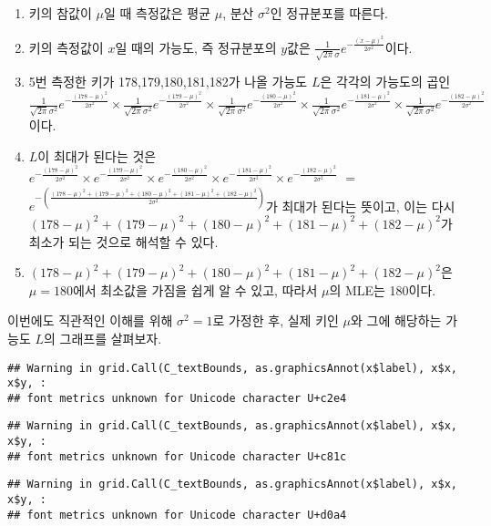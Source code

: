 \documentclass[]{book}
\providecommand{\tightlist}{%
  \setlength{\itemsep}{0pt}\setlength{\parskip}{0pt}}
\begin{document}
\begin{enumerate}
\def\labelenumi{\arabic{enumi}.}
\tightlist
\item
  키의 참값이 \(\mu\)일 때 측정값은 평균 \(\mu\), 분산 \(\sigma^2\)인 정규분포를 따른다.
\item
  키의 측정값이 \(x\)일 때의 가능도, 즉 정규분포의 \(y\)값은 \(\frac{1}{\sqrt{2\pi}\sigma}e^{-\frac{(x-\mu)^2}{2\sigma^2}}\)이다.
\item
  5번 측정한 키가 178,179,180,181,182가 나올 가능도 \(L\)은 각각의 가능도의 곱인 \(\frac{1}{\sqrt{2\pi}\sigma^2}e^{-\frac{(178-\mu)^2}{2\sigma^2}}\times\frac{1}{\sqrt{2\pi}\sigma^2}e^{-\frac{(179-\mu)^2}{2\sigma^2}}\times\frac{1}{\sqrt{2\pi}\sigma^2}e^{-\frac{(180-\mu)^2}{2\sigma^2}}\times\frac{1}{\sqrt{2\pi}\sigma^2}e^{-\frac{(181-\mu)^2}{2\sigma^2}}\times\frac{1}{\sqrt{2\pi}\sigma^2}e^{-\frac{(182-\mu)^2}{2\sigma^2}}\)이다.
\item
  \(L\)이 최대가 된다는 것은 \(e^{-\frac{(178-\mu)^2}{2\sigma^2}}\times e^{-\frac{(179-\mu)^2}{2\sigma^2}}\times e^{-\frac{(180-\mu)^2}{2\sigma^2}}\times e^{-\frac{(181-\mu)^2}{2\sigma^2}}\times e^{-\frac{(182-\mu)^2}{2\sigma^2}}\) \(=\) \(e^{-(\frac{(178-\mu)^2+(179-\mu)^2+(180-\mu)^2+(181-\mu)^2+(182-\mu)^2}{2\sigma^2})}\)가 최대가 된다는 뜻이고, 이는 다시 \((178-\mu)^2+(179-\mu)^2+(180-\mu)^2+(181-\mu)^2+(182-\mu)^2\)가 최소가 되는 것으로 해석할 수 있다.
\item
  \((178-\mu)^2+(179-\mu)^2+(180-\mu)^2+(181-\mu)^2+(182-\mu)^2\)은 \(\mu=180\)에서 최소값을 가짐을 쉽게 알 수 있고, 따라서 \(\mu\)의 MLE는 180이다.
\end{enumerate}

이번에도 직관적인 이해를 위해 \(\sigma^2=1\)로 가정한 후, 실제 키인 \(\mu\)와 그에 해당하는 가능도 \(L\)의 그래프를 살펴보자.

\begin{verbatim}
## Warning in grid.Call(C_textBounds, as.graphicsAnnot(x$label), x$x, x$y, :
## font metrics unknown for Unicode character U+c2e4
\end{verbatim}

\begin{verbatim}
## Warning in grid.Call(C_textBounds, as.graphicsAnnot(x$label), x$x, x$y, :
## font metrics unknown for Unicode character U+c81c
\end{verbatim}

\begin{verbatim}
## Warning in grid.Call(C_textBounds, as.graphicsAnnot(x$label), x$x, x$y, :
## font metrics unknown for Unicode character U+d0a4
\end{verbatim}
\end{document}
